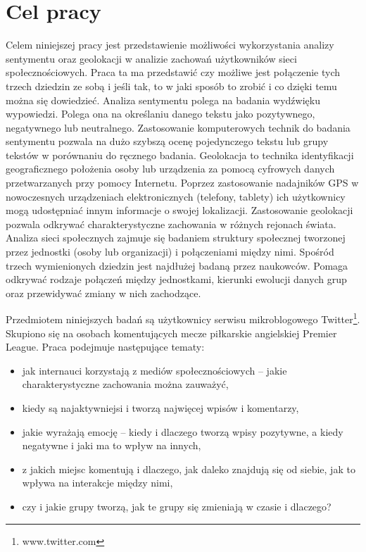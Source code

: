 \section{Cel pracy}
Celem niniejszej pracy jest przedstawienie możliwości wykorzystania
analizy sentymentu oraz geolokacji w analizie zachowań użytkowników sieci
społecznościowych. Praca ta ma przedstawić czy możliwe jest połączenie tych
trzech dziedzin ze sobą i jeśli tak, to w jaki sposób to zrobić i co dzięki
temu można się dowiedzieć. 
Analiza sentymentu polega na badania wydźwięku
wypowiedzi. Polega ona na określaniu danego tekstu jako pozytywnego, negatywnego lub neutralnego.
Zastosowanie komputerowych technik do badania sentymentu pozwala na dużo szybszą
ocenę pojedynczego tekstu lub grupy tekstów w porównaniu do ręcznego badania.
Geolokacja to technika identyfikacji geograficznego położenia osoby lub
urządzenia za pomocą cyfrowych danych przetwarzanych przy pomocy Internetu.
Poprzez zastosowanie nadajników GPS w nowoczesnych urządzeniach elektronicznych
(telefony, tablety) ich użytkownicy mogą udostępniać innym informacje o swojej
lokalizacji. Zastosowanie geolokacji pozwala odkrywać charakterystyczne
zachowania w różnych rejonach świata.
Analiza sieci społecznych zajmuje się badaniem struktury społecznej tworzonej
przez jednostki (osoby lub organizacji) i połączeniami między nimi. Spośród
trzech wymienionych dziedzin jest najdłużej badaną przez naukowców. Pomaga
odkrywać rodzaje połączeń między jednostkami, kierunki ewolucji danych grup oraz
przewidywać zmiany w nich zachodzące.

Przedmiotem niniejszych badań są użytkownicy serwisu mikroblogowego
Twitter\footnote{www.twitter.com}. Skupiono się na osobach komentujących mecze
piłkarskie angielskiej Premier League. Praca podejmuje następujące tematy:
\begin{itemize}
  \item jak internauci korzystają z mediów społecznościowych -- jakie
  charakterystyczne zachowania można zauważyć,
  \item kiedy są najaktywniejsi i tworzą najwięcej wpisów i komentarzy,
  \item jakie wyrażają emocję -- kiedy i dlaczego tworzą wpisy pozytywne, a
  kiedy negatywne i jaki ma to wpływ na innych,
  \item z jakich miejsc komentują i dlaczego, jak daleko znajdują się od
  siebie, jak to wpływa na interakcje między nimi,
  \item czy i jakie grupy tworzą, jak te grupy się zmieniają w czasie i
  dlaczego?
\end{itemize}

